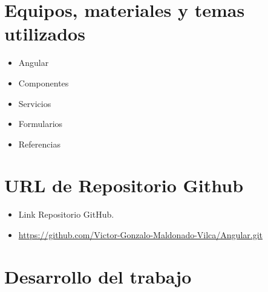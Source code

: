 \documentclass{article}
\begin{document}
		
	\section{Equipos, materiales y temas utilizados}
  \begin{itemize}
    \item Angular
    \item Componentes
    \item Servicios
    \item Formularios
    \item Referencias
  \end{itemize}
 

  \section{URL de Repositorio Github}
  \begin{itemize}
    \item Link Repositorio GitHub.
    \item \url{https://github.com/Victor-Gonzalo-Maldonado-Vilca/Angular.git}
  \end{itemize}


  \section{Desarrollo del trabajo}
  
\end{document}
